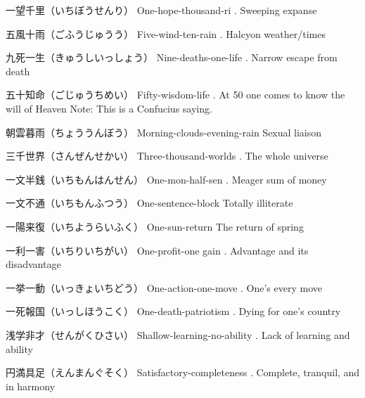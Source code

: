 \par{一望千里（いちぼうせんり） \hfill\break
One-hope-thousand-ri \hfill{}. Sweeping expanse }

\par{五風十雨（ごふうじゅうう） \hfill\break
Five-wind-ten-rain \hfill{}. Halcyon weather\slash times }

\par{九死一生（きゅうしいっしょう） \hfill\break
Nine-deaths-one-life \hfill{}. Narrow escape from death }

\par{五十知命（ごじゅうちめい） \hfill\break
Fifty-wisdom-life \hfill{}. At 50 one comes to know the will of Heaven \hfill\break
Note: This is a Confucius saying. }

\par{朝雲暮雨（ちょううんぼう） \hfill\break
Morning-clouds-evening-rain \hfill\break
Sexual liaison \hfill\break
}

\par{三千世界（さんぜんせかい） \hfill\break
Three-thousand-worlds \hfill{}. The whole universe }

\par{一文半銭（いちもんはんせん） \hfill\break
One-mon-half-sen \hfill{}. Meager sum of money }

\par{一文不通（いちもんふつう） \hfill\break
One-sentence-block \hfill\break
Totally illiterate }

\par{一陽来復（いちようらいふく） \hfill\break
One-sun-return \hfill\break
The return of spring }

\par{一利一害（いちりいちがい） \hfill\break
One-profit-one gain \hfill{}. Advantage and its disadvantage }

\par{一挙一動（いっきょいちどう） \hfill\break
One-action-one-move \hfill{}. One's every move }

\par{一死報国（いっしほうこく） \hfill\break
One-death-patriotism \hfill{}. Dying for one's country }

\par{浅学非才（せんがくひさい） \hfill\break
Shallow-learning-no-ability \hfill{}. Lack of learning and ability }

\par{円満具足（えんまんぐそく） \hfill\break
Satisfactory-completeness \hfill{}. Complete, tranquil, and in harmony }

